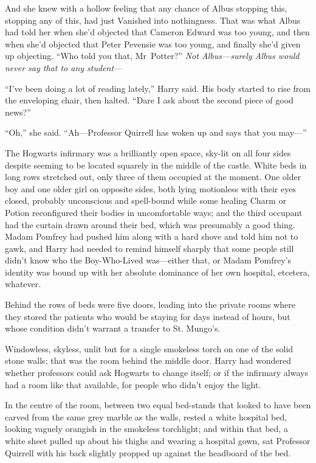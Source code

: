 And she knew with a hollow feeling that any chance of Albus stopping this, stopping any of this, had just Vanished into nothingness. That was what Albus had told her when she’d objected that Cameron Edward was too young, and then when she’d objected that Peter Pevensie was too young, and finally she’d given up objecting. “Who told you that, Mr~Potter?” \emph{Not Albus—surely Albus would never \emph{say} that to any student—}

“I’ve been doing a lot of reading lately,” Harry said. His body started to rise from the enveloping chair, then halted. “Dare I ask about the second piece of good news?”

“Oh,” she said. “Ah—Professor Quirrell has woken up and says that you may—”

\later

The Hogwarts infirmary was a brilliantly open space, sky-lit on all four sides despite seeming to be located squarely in the middle of the castle. White beds in long rows stretched out, only three of them occupied at the moment. One older boy and one older girl on opposite sides, both lying motionless with their eyes closed, probably unconscious and spell-bound while some healing Charm or Potion reconfigured their bodies in uncomfortable ways; and the third occupant had the curtain drawn around their bed, which was presumably a good thing. Madam Pomfrey had pushed him along with a hard shove and told him not to gawk, and Harry had needed to remind himself sharply that some people still didn’t know who the Boy-Who-Lived was—either that, or Madam Pomfrey’s identity was bound up with her absolute dominance of her own hospital, etcetera, whatever.

Behind the rows of beds were five doors, leading into the private rooms where they stored the patients who would be staying for days instead of hours, but whose condition didn’t warrant a transfer to St. Mungo’s.

Windowless, skyless, unlit but for a single smokeless torch on one of the solid stone walls; that was the room behind the middle door. Harry had wondered whether professors could ask Hogwarts to change itself; or if the infirmary always had a room like that available, for people who didn’t enjoy the light.

In the centre of the room, between two equal bed-stands that looked to have been carved from the same grey marble as the walls, rested a white hospital bed, looking vaguely orangish in the smokeless torchlight; and within that bed, a white sheet pulled up about his thighs and wearing a hospital gown, sat Professor Quirrell with his back slightly propped up against the headboard of the bed.

